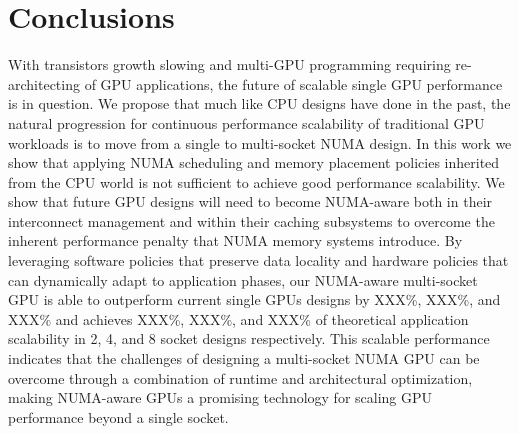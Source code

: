 \section{Conclusions}
\label{conclusions}
With transistors growth slowing and multi-GPU programming requiring 
re-architecting of GPU applications, the future of scalable single GPU 
performance is in question.  We propose that much like CPU designs have done in 
the past, the natural progression for continuous performance scalability of 
traditional GPU workloads is to move from a single to multi-socket NUMA design.  
In this work we show 
that applying NUMA scheduling and memory placement policies inherited 
from the CPU world is not sufficient to achieve good performance scalability.  
We show that future GPU designs will need to become NUMA-aware both in their 
interconnect management and within their caching subsystems to overcome the 
inherent performance penalty that NUMA memory systems introduce.  By leveraging 
software policies that preserve data locality and hardware policies that can 
dynamically adapt to application phases, our NUMA-aware multi-socket GPU is able to 
outperform current single GPUs designs by XXX\%, XXX\%, and XXX\% and 
achieves XXX\%, XXX\%, and XXX\% of theoretical application scalability in 2, 4, 
and 8 socket designs respectively.  This scalable performance indicates that the 
challenges of designing a multi-socket NUMA GPU can be overcome through a combination
of runtime and architectural optimization, making 
NUMA-aware GPUs a promising technology for scaling GPU performance beyond a 
single socket.


